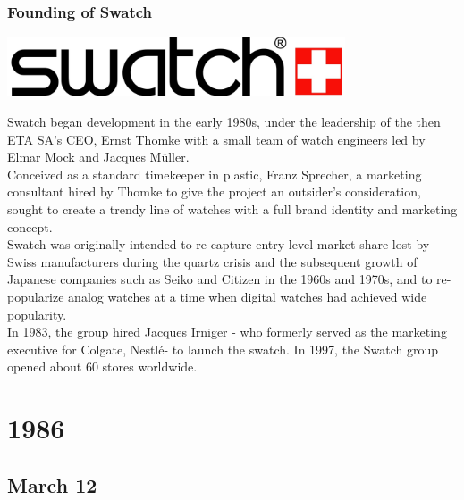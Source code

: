 \documentclass[11pt]{report}
\begin{document}
\subsection{Founding of Swatch}
\vspace{2mm}\begin{center}\includegraphics[width=10cm]{./img/swatchLogo.jpg}\end{center}
Swatch began development in the early 1980s, under the leadership of the then ETA SA's CEO, Ernst Thomke with a small team of watch engineers led by Elmar Mock and Jacques Müller.\\
\indent Conceived as a standard timekeeper in plastic, Franz Sprecher, a marketing consultant hired by Thomke to give the project an outsider's consideration, sought to create a trendy line of watches with a full brand identity and marketing concept.\\
\indent Swatch was originally intended to re-capture entry level market share lost by Swiss manufacturers during the quartz crisis and the subsequent growth of Japanese companies such as Seiko and Citizen in the 1960s and 1970s, and to re-popularize analog watches at a time when digital watches had achieved wide popularity.\\
\indent In 1983, the group hired Jacques Irniger - who formerly served as the marketing executive for Colgate, Nestlé- to launch the swatch.
In 1997, the Swatch group opened about 60 stores worldwide.

\chapter{1986}
\section{March 12}
\end{document}
